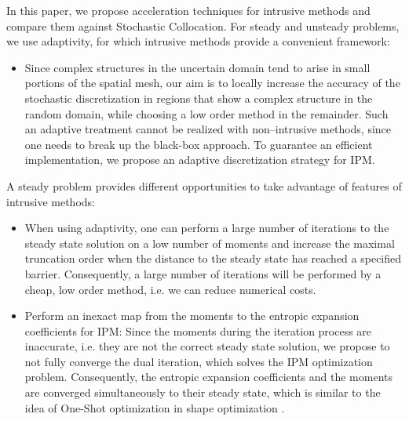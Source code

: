 In this paper, we propose acceleration techniques for intrusive methods and compare them against Stochastic Collocation. For steady and unsteady problems, we use adaptivity, for which intrusive methods provide a convenient framework: %
\begin{itemize}
\item Since complex structures in the uncertain domain tend to arise in small portions of the spatial mesh, our aim is to locally increase the accuracy of the stochastic discretization in regions that show a complex structure in the random domain, while choosing a low order method in the remainder. Such an adaptive treatment cannot be realized with non--intrusive methods, since one needs to break up the black-box approach. To guarantee an efficient implementation, we propose an adaptive discretization strategy for IPM.
\end{itemize}
A steady problem provides different opportunities to take advantage of features of intrusive methods: 
\begin{itemize}
\item When using adaptivity, one can perform a large number of iterations to the steady state solution on a low number of moments and increase the maximal truncation order when the distance to the steady state has reached a specified barrier. Consequently, a large number of iterations will be performed by a cheap, low order method, i.e. we can reduce numerical costs. 
\item Perform an inexact map from the moments to the entropic expansion coefficients for IPM: Since the moments during the iteration process are inaccurate, i.e. they are not the correct steady state solution, we propose to not fully converge the dual iteration, which solves the IPM optimization problem. Consequently, the entropic expansion coefficients and the moments are converged simultaneously to their steady state, which is similar to the idea of One-Shot optimization in shape optimization \cite{hazra2005aerodynamic}.
\end{itemize}

